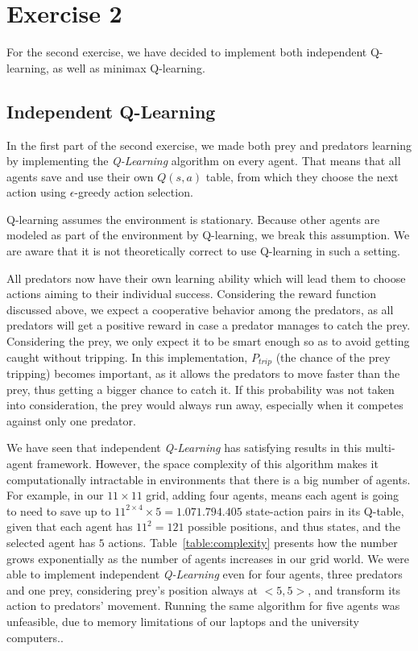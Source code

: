 \documentclass[a4paper,11pt]{article}
\begin{document}
\section{Exercise 2}
For the second exercise, we have decided to implement both independent Q-learning, as well as minimax Q-learning.

\subsection{Independent Q-Learning}
In the first part of the second exercise, we made both prey and predators learning by implementing the \textit{Q-Learning} algorithm on every agent. That means that all agents save and use their own $Q(s,a)$ table, from which they choose the next action using $\epsilon$-greedy action selection.

Q-learning assumes the environment is stationary.  Because other agents are modeled as part of the environment by Q-learning, we break this assumption.  We are aware that it is not theoretically correct to use Q-learning in such a setting.

All predators now have their own learning ability which will lead them to choose actions aiming to their individual success. Considering the reward function discussed above, we expect a cooperative behavior among the predators, as all predators will get a positive reward in case a predator manages to catch the prey. Considering the prey, we only expect it to be smart enough so as to avoid getting caught without tripping. In this implementation, $P_{trip}$ (the chance of the prey tripping) becomes important, as it allows the predators to move faster than the prey, thus getting a bigger chance to catch it. If this probability was not taken into consideration, the prey would always run away, especially when it competes against only one predator.

We have seen that independent \textit{Q-Learning} has satisfying results in this multi-agent framework. However, the space complexity of this algorithm makes it computationally intractable in environments that there is a big number of agents. For example, in our $11 \times 11$ grid, adding four agents, means  each agent is going to need to save up to $11^{2 \times 4} \times 5 = 1.071.794.405$ state-action pairs in its Q-table, given that each agent has $11^2 = 121$ possible positions, and thus states, and the selected agent has $5$ actions. Table~\ref{table:complexity} presents how the number grows exponentially as the number of agents increases in our grid world. We were able to implement independent \textit{Q-Learning} even for four agents, three predators and one prey, considering prey's position always at $<5,5>$, and transform its action to predators' movement. Running the same algorithm for five agents was unfeasible, due to memory limitations of our laptops and the university computers..
\end{document}

